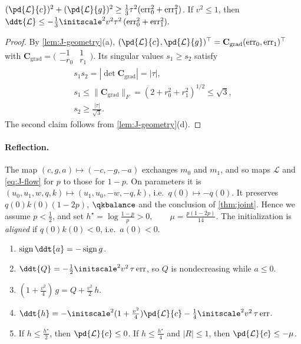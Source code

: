 \begin{lemma}
\label{lem:J-gradient}
$(\pd{\mathcal L}{c})^2+(\pd{\mathcal L}{g})^2\ge\frac{1}{3}\tau^2(\mathrm{err}_0^2+\mathrm{err}_1^2)$. If $v^2\le1$, then
 $\ddt{\mathcal L}\le-\tfrac{1}{3}\initscale^2v^2\tau^2\,(\mathrm{err}_0^2+\mathrm{err}_1^2).$ 
\end{lemma}

\begin{proof}
By \cref{lem:J-geometry}(a), $(\pd{\mathcal L}{c},\pd{\mathcal L}{g})^\top=\mathbf C_{\mathrm{grad}}(\mathrm{err}_0,\mathrm{err}_1)^\top$ with $\mathbf C_{\mathrm{grad}}=\bigl(\begin{smallmatrix}-1&1\\-r_0&r_1\end{smallmatrix}\bigr)$. Its singular values $s_1\ge s_2$
satisfy
 \[
\begin{gathered}
s_1s_2=|\det\mathbf C_{\mathrm{grad}}|=|\tau|,\\ s_1\le\|\mathbf C_{\mathrm{grad}}\|_F=(2+r_0^2+r_1^2)^{1/2}\le\sqrt3,\\ s_2\ge\frac{|\tau|}{\sqrt3} .
\end{gathered}
\] 
The second claim follows from \cref{lem:J-geometry}(d).
\end{proof}

\paragraph{Reflection.} The map $(c,g,a)\mapsto(-c,-g,-a)$ exchanges $m_0$ and $m_1$, and so maps $\mathcal L$ and \cref{eq:J-flow} for $p$ to those
for $1-p$. On parameters it is $(u_0,u_1,w,q,k)\mapsto(u_1,u_0,-w,-q,k)$, i.e.\ $q(0)\mapsto-q(0)$. It preserves $q(0)k(0)(1-2p)$, $\qkbalance$ and the
conclusion of \cref{thm:joint}. Hence we assume $p<\frac{1}{2}$, and set
 $h^\star=\log\frac{1-p}{p}>0,\qquad \mu=\frac{p(1-2p)}{14}.$ 
The initialization is \emph{aligned} if $q(0)k(0)<0$, i.e.\ $a(0)<0$.

\begin{lemma}
\label{lem:J-drift}
\begin{enumerate}[label=(\alph*),leftmargin=*,itemsep=2pt,topsep=3pt]
\item $\operatorname{sign}\ddt{a}=-\operatorname{sign}g$.
\item $\ddt{Q}=-\frac{1}{2}\initscale^2v^2\,\tau\,\mathrm{err}$, so $Q$ is nondecreasing while $a\le0$.
\item $(1+\frac{v^2}{4})\,g=Q+\frac{v^2}{2}\,h$.
\item $\ddt{h}=-\initscale^2(1+\frac{v^2}{4})\pd{\mathcal L}{c}-\frac{1}{4}\initscale^2v^2\,\tau\,\mathrm{err}$.
\item If $h\le\frac{h^\star}{2}$, then $\pd{\mathcal L}{c}\le0$. If $h\le\frac{h^\star}{4}$ and $|R|\le1$, then $\pd{\mathcal L}{c}\le-\mu$.
\end{enumerate}
\end{lemma}

